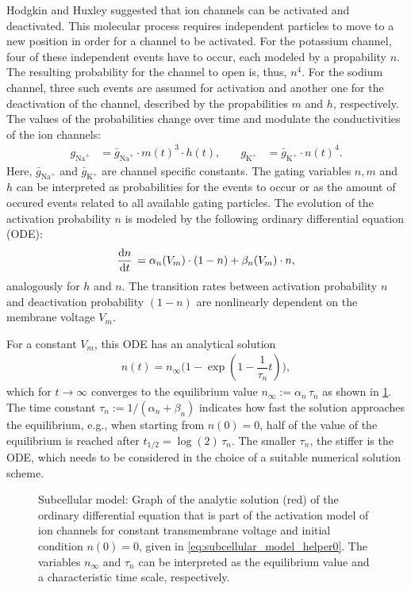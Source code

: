 Hodgkin and Huxley suggested that ion channels can be activated and deactivated. This molecular process requires independent  particles to move to a new position in order for a channel to be activated. For the potassium channel, four of these independent events have to occur, each modeled by a propability $n$. The resulting probability for the channel to open is, thus, $n^4$. For the sodium channel, three such events are assumed for activation and another one for the deactivation of the channel, described by the propabilities $m$ and $h$, respectively. The values of the probabilities change over time and modulate the conductivities of the ion channels:
%
\begin{align*}
  g_{\text{Na}^{+}} &= \bar{g}_{\text{Na}^{+}} \cdot m(t)^3 \cdot h(t), \quad &g_{\text{K}^{+}} &= \bar{g}_{\text{K}^{+}} \cdot n(t)^4.
\end{align*}
%
Here, $\bar{g}_{\text{Na}^{+}}$ and $\bar{g}_{\text{K}^{+}}$ are channel specific constants. The gating variables $n,m$ and $h$ can be interpreted as probabilities for the events to occur or as the amount of occured events related to all available gating particles. 
The evolution of the activation probability $n$ is modeled by the following ordinary differential equation (ODE):%
\begin{align*}
  \d{n}{t} = \alpha_n(V_m) \cdot (1-n) + \beta_n(V_m) \cdot n,
\end{align*}
analogously for $h$ and $n$. The transition rates between activation probability $n$ and deactivation probability $(1-n)$ are nonlinearly dependent on the membrane voltage $V_m$.

For a constant $V_m$, this ODE has an analytical solution
\begin{align}\label{eq:subcellular_model_helper0}
  n(t) = n_\infty\big(1 - \exp(1 - \dfrac{1}{\tau_n}t)\big),
\end{align}
which for $t\to \infty$ converges to the equilibrium value $n_\infty := \alpha_n\,\tau_n$ as shown in \cref{fig:ode_solution}. The time constant $\tau_n := 1/(\alpha_n + \beta_n)$ indicates how fast the solution approaches the equilibrium, e.g., when starting from $n(0)=0$, half of the value of the equilibrium is reached after $t_{1/2}=\log(2)\,\tau_n$. The smaller $\tau_n$, the stiffer is the ODE, which needs to be considered in the choice of a suitable numerical solution scheme.

\begin{figure}%
  \centering%
  \def\svgwidth{0.4\textwidth}
  \caption{Subcellular model: Graph of the analytic solution (red) of the ordinary differential equation that is part of the activation model of ion channels for constant transmembrane voltage and initial condition $n(0)=0$, given in \cref{eq:subcellular_model_helper0}. The variables $n_\infty$ and $\tau_n$ can be interpreted as the equilibrium value and a characteristic time scale, respectively.}%
  \label{fig:ode_solution}%
\end{figure}

